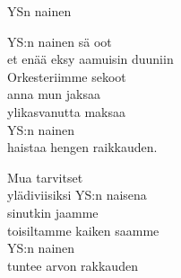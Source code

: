 \begin{song}{YSn nainen}

    YS:n nainen sä oot\\
    et enää eksy aamuisin duuniin\\
    Orkesteriimme sekoot\\
    anna mun jaksaa\\
    ylikasvanutta maksaa\\
    YS:n nainen\\
    haistaa hengen raikkauden.

    Mua tarvitset\\
    ylädiviisiksi YS:n naisena\\
    sinutkin jaamme\\
    toisiltamme kaiken saamme\\
    YS:n nainen\\
    tuntee arvon rakkauden

\end{song}
